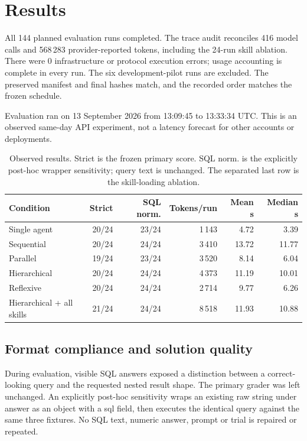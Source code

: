 \section{Results}
All 144 planned evaluation runs completed. The trace audit reconciles 416 model calls and 568\,283 provider-reported tokens, including the 24-run skill ablation. There were 0 infrastructure or protocol execution errors; usage accounting is complete in every run. The six development-pilot runs are excluded. The preserved manifest and final hashes match, and the recorded order matches the frozen schedule.

Evaluation ran on 13 September 2026 from 13:09:45 to 13:33:34 UTC. This is an observed same-day API experiment, not a latency forecast for other accounts or deployments.

\begin{table}[htbp]
\centering\small
\setlength{\tabcolsep}{4pt}
\begin{tabular}{@{}lrrrrr@{}}
\toprule
\textbf{Condition} & \textbf{Strict} & \textbf{SQL norm.} & \textbf{Tokens/run} & \textbf{Mean s} & \textbf{Median s}\\
\midrule
Single agent & 20/24 & 23/24 & 1\,143 & 4.72 & 3.39\\
Sequential & 20/24 & 24/24 & 3\,410 & 13.72 & 11.77\\
Parallel & 19/24 & 23/24 & 3\,520 & 8.14 & 6.04\\
Hierarchical & 20/24 & 24/24 & 4\,373 & 11.19 & 10.01\\
Reflexive & 20/24 & 24/24 & 2\,714 & 9.77 & 6.26\\
\midrule
Hierarchical + all skills & 21/24 & 24/24 & 8\,518 & 11.93 & 10.88\\
\bottomrule
\end{tabular}
\caption{Observed results. Strict is the frozen primary score. SQL norm. is the explicitly post-hoc wrapper sensitivity; query text is unchanged. The separated last row is the skill-loading ablation.}
\label{tab:results}
\end{table}

\subsection{Format compliance and solution quality}
During evaluation, visible SQL answers exposed a distinction between a correct-looking query and the requested nested result shape. The primary grader was left unchanged. An explicitly post-hoc sensitivity wraps an existing raw string under answer as an object with a sql field, then executes the identical query against the same three fixtures. No SQL text, numeric answer, prompt or trial is repaired or repeated.

